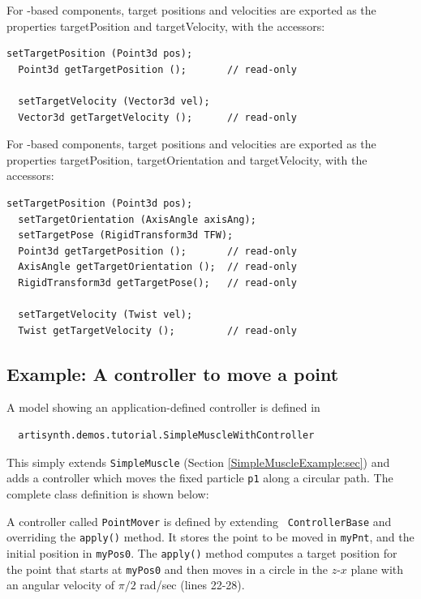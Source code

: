 For -based components,
target positions and velocities are exported as the properties {\sf
targetPosition} and {\sf targetVelocity}, with the accessors:
%
\begin{lstlisting}[]
  setTargetPosition (Point3d pos);
  Point3d getTargetPosition ();       // read-only

  setTargetVelocity (Vector3d vel);
  Vector3d getTargetVelocity ();      // read-only
\end{lstlisting}
%
For -based components, target
positions and velocities are exported as the properties {\sf targetPosition},
{\sf targetOrientation} and {\sf targetVelocity}, with the accessors:
\begin{lstlisting}[]
  setTargetPosition (Point3d pos);
  setTargetOrientation (AxisAngle axisAng);
  setTargetPose (RigidTransform3d TFW);
  Point3d getTargetPosition ();       // read-only
  AxisAngle getTargetOrientation ();  // read-only
  RigidTransform3d getTargetPose();   // read-only

  setTargetVelocity (Twist vel);
  Twist getTargetVelocity ();         // read-only
\end{lstlisting}
%

\subsection{Example: A controller to move a point}

A model showing an application-defined controller is defined in
%
\begin{verbatim}
  artisynth.demos.tutorial.SimpleMuscleWithController
\end{verbatim}
%
This simply extends {\tt SimpleMuscle} (Section
\ref{SimpleMuscleExample:sec}) and adds a controller which moves the
fixed particle {\tt p1} along a circular path.  The complete class
definition is shown below:
%
\lstset{numbers=left}

\lstset{numbers=none}
%
A controller called {\tt PointMover} is defined by extending {\tt
ControllerBase} and overriding the {\tt apply()} method. It stores the
point to be moved in {\tt myPnt}, and the initial position in
{\tt myPos0}. The {\tt apply()} method computes a target position for
the point that starts at {\tt myPos0} and then moves in a circle in the
$z$-$x$ plane with an angular velocity of $\pi/2$ rad/sec (lines 22-28).

